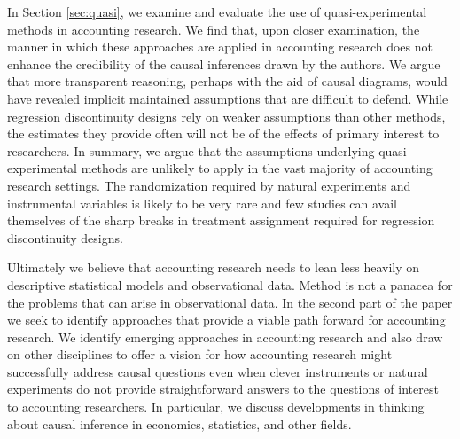 \documentclass[11pt,reqno,titlepage]{amsart}
\begin{document}
\begin{doublespace}
In Section \ref{sec:quasi}, we examine and evaluate the use of quasi-experimental methods in accounting research.
We find that, upon closer examination, the manner in which these approaches are applied in accounting research does not enhance the credibility of the causal inferences drawn by the authors.
We argue that more transparent reasoning, perhaps with the aid of causal diagrams, would have revealed implicit maintained assumptions that are difficult to defend.
While regression discontinuity designs rely on weaker assumptions than other methods, the estimates they provide often will not be of the effects of primary interest to researchers.
In summary, we argue that the assumptions underlying quasi-experimental methods are unlikely to apply in the vast majority of accounting research settings.
The randomization required by natural experiments and instrumental variables is likely to be very rare and few studies can avail themselves of the sharp breaks in treatment assignment required for regression discontinuity designs.

Ultimately we believe that accounting research needs to lean less heavily on descriptive statistical models and observational data.
Method is not a panacea for the problems that can arise in observational data. 
In the second part of the paper we seek to identify approaches that provide a viable path forward for accounting research.
We identify emerging approaches in accounting research and also draw on other disciplines to offer a vision for how accounting research might successfully address causal questions even when clever instruments or natural experiments do not provide straightforward answers to the questions of interest to accounting researchers.
In particular, we discuss developments in thinking about causal inference in economics, statistics, and other fields.


\end{doublespace}
\end{document}
